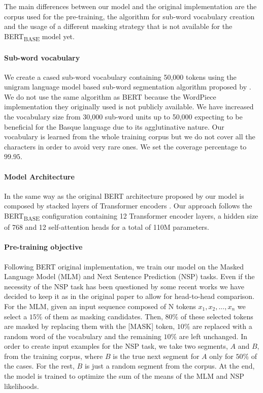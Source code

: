 \documentclass[10pt, a4paper]{article}
\begin{document}
The main differences between our model and the original implementation are the corpus used for the pre-training, the algorithm for sub-word vocabulary creation and the usage of a different masking strategy that is not available for the BERT\textsubscript{BASE} model yet.

\paragraph{Sub-word vocabulary}

We create a cased sub-word vocabulary containing 50,000 tokens using the unigram language model based sub-word segmentation algorithm proposed by . We do not use the same algorithm as BERT because the WordPiece \cite{wu2016google} implementation they originally used is not publicly available. We have increased the vocabulary size from 30,000 sub-word units up to 50,000 expecting to be beneficial for the Basque language due to its agglutinative nature. Our vocabulary is learned from the whole training corpus but we do not cover all the characters in order to avoid very rare ones. We set the coverage percentage to $99.95$.

\paragraph{Model Architecture}

In the same way as the original BERT architecture proposed by  our model is composed by stacked layers of Transformer encoders \cite{vaswani2017attention}. Our approach follows the BERT\textsubscript{BASE} configuration containing 12 Transformer encoder layers, a hidden size of 768 and 12 self-attention heads for a total of 110M parameters.

\paragraph{Pre-training objective}

Following BERT original implementation, we train our model on the Masked Language Model (MLM) and Next Sentence Prediction (NSP) tasks. Even if the necessity of the NSP task has been questioned by some recent works \cite{yang2019xlnet,liu2019roberta,lample2019cross} we have decided to keep it as in the original paper to allow for head-to-head comparison. For the MLM, given an input sequence composed of N tokens $x_1, x_2, ..., x_n$ we select a $15\%$ of them as masking candidates. Then, $80\%$ of these selected tokens are masked by replacing them with the [MASK] token, $10\%$ are replaced with a random word of the vocabulary and the remaining $10\%$ are left unchanged. In order to create input examples for the NSP task, we take two segments, $A$ and $B$, from the training corpus, where $B$ is the true next segment for $A$ only for $50\%$ of the cases. For the rest, $B$ is just a random segment from the corpus. At the end, the model is trained to optimize the sum of the means of the MLM and NSP likelihoods.
\end{document}
